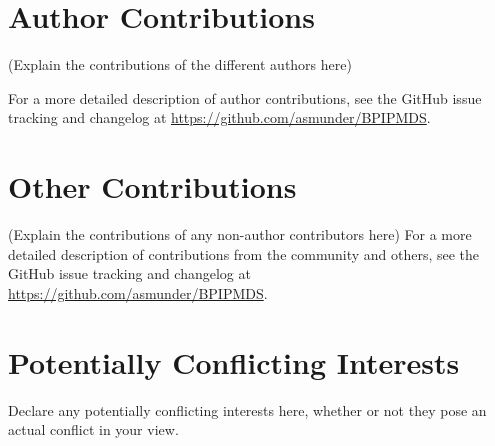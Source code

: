 \documentclass[9pt,bestpractices]{livecoms}
\newcommand{\githubrepository}{\url{https://github.com/asmunder/BPIPMDS}}  %
\begin{document}
\begin{mdframed}[backgroundcolor=orange!20]
\section{Author Contributions}
%

(Explain the contributions of the different authors here)

For a more detailed description of author contributions,
see the GitHub issue tracking and changelog at \githubrepository.

\section{Other Contributions}
%

(Explain the contributions of any non-author contributors here)
For a more detailed description of contributions from the community and others, see the GitHub issue tracking and changelog at \githubrepository.

\section{Potentially Conflicting Interests}

Declare any potentially conflicting interests here, whether or not they pose an actual conflict in your view.
\end{mdframed}
\end{document}

